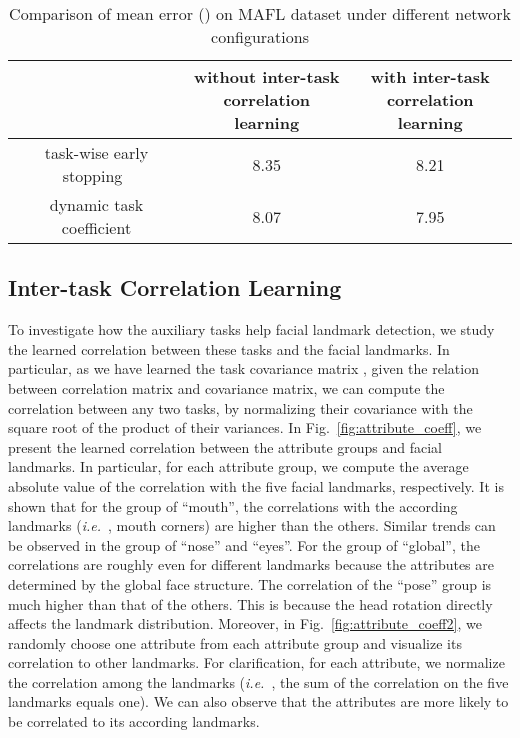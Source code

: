 \documentclass[10pt,journal,compsoc]{IEEEtran}
\newcommand{\ie}{\emph{i.e.}~}
\begin{document}
\begin{table}[t]
\caption{Comparison of mean error () on MAFL dataset under different network configurations}
\vskip -0.35cm
\label{tab:conf}
\begin{center}
	\setlength{\tabcolsep}{.0667em}
\begin{tabular}{c|c|c}
\hline
&\parbox{2.5cm}{without inter-task\\correlation learning}&\parbox{2.5cm}{with inter-task\\correlation learning}\\
\hline\hline
task-wise early stopping~\cite{zhang2014facial}&8.35&8.21\\
dynamic task coefficient&8.07&7.95\\
\hline
\end{tabular}
\end{center}
\end{table}


\subsection{Inter-task Correlation Learning}
To investigate how the auxiliary tasks help facial landmark detection, we study the learned correlation between these tasks and the facial landmarks. In particular, as we have learned the task covariance matrix , given the relation between correlation matrix and covariance matrix, we can compute the correlation between any two tasks, by normalizing their covariance with the square root of the product of their variances. In Fig.~\ref{fig:attribute_coeff}, we present the learned correlation between the attribute groups and facial landmarks. In particular, for each attribute group, we compute the average absolute value of the correlation with the five facial landmarks, respectively. It is shown that for the group of ``mouth'', the correlations with the according landmarks (\ie, mouth corners) are higher than the others. Similar trends can be observed in the group of ``nose'' and ``eyes''. For the group of ``global'', the correlations are roughly even for different landmarks because the attributes are determined by the global face structure. The correlation of the ``pose'' group is much higher than that of the others. This is because the head rotation directly affects the landmark distribution. Moreover, in Fig.~\ref{fig:attribute_coeff2}, we randomly choose one attribute from each attribute group and visualize its correlation to other landmarks. For clarification, for each attribute, we normalize the correlation among the landmarks (\ie, the sum of the correlation on the five landmarks equals one). We can also observe that the attributes are more likely to be correlated to its according landmarks.
\end{document}
